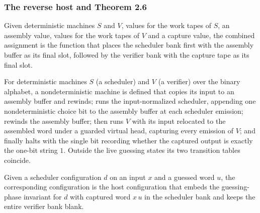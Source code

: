 \subsubsection{The reverse host and Theorem 2.6}

\begin{definition}
\label{Complexity.b2Slots}
\leanok
{}
Given deterministic machines $S$ and $V$, values for the work tapes of $S$, an assembly value, values for the work tapes of $V$ and a capture value, the combined assignment is the function that places the scheduler bank first with the assembly buffer as its final slot, followed by the verifier bank with the capture tape as its final slot.
\end{definition}

\begin{definition}
\label{Complexity.b2Host}
\leanok
{}
For deterministic machines $S$ (a scheduler) and $V$ (a verifier) over the binary alphabet, a nondeterministic machine is defined that copies its input to an assembly buffer and rewinds; runs the input-normalized scheduler, appending one nondeterministic choice bit to the assembly buffer at each scheduler emission; rewinds the assembly buffer; then runs $V$ with its input relocated to the assembled word under a guarded virtual head, capturing every emission of $V$; and finally halts with the single bit recording whether the captured output is exactly the one-bit string $1$. Outside the live guessing states its two transition tables coincide.
\end{definition}

\begin{definition}
\label{Complexity.b2GuessCfg}
\leanok
{}
Given a scheduler configuration $d$ on an input $x$ and a guessed word $u$, the corresponding configuration is the host configuration that embeds the guessing-phase invariant for $d$ with captured word $x\,u$ in the scheduler bank and keeps the entire verifier bank blank.
\end{definition}

